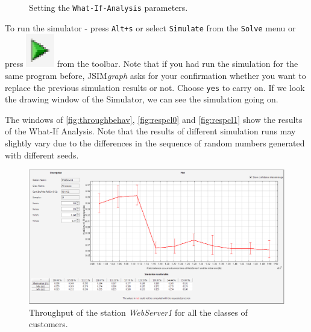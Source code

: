 \begin{itemize*}
\begin{figure}[htb]
\begin{center}
    \end{center}
    \caption{Setting the \texttt{What-If-Analysis} parameters.}
    \label{fig:wiaparam}
\end{figure}
\item To run the simulator - press \texttt{Alt+s} or select
\texttt{Simulate} from the \texttt{Solve} menu or press
\includegraphics[scale=.5]{img/jsimg/play}
from the toolbar. Note that if you had run the simulation for the
same program before, JSIM\emph{graph} asks for your confirmation
whether you want to replace the previous simulation results or
not. Choose \texttt{yes} to carry on. If we look the drawing
window of the Simulator, we can see the simulation going on.
\end{itemize*}
The windows of \autoref{fig:throughbehav}, \autoref{fig:respcl0} and
\autoref{fig:respcl1} show the results of the What-If Analysis. Note
that the results of different simulation runs may slightly vary
due to the differences in the sequence of random numbers generated
with different seeds.
\begin{figure}[htb]
    \begin{center}
        \includegraphics[scale=.36]{img/jsimg/EX2Throughput.eps}
    \end{center}
    \caption{Throughput of the station \emph{WebServer1} for all the classes of customers.}
    \label{fig:throughbehav}
\end{figure}


